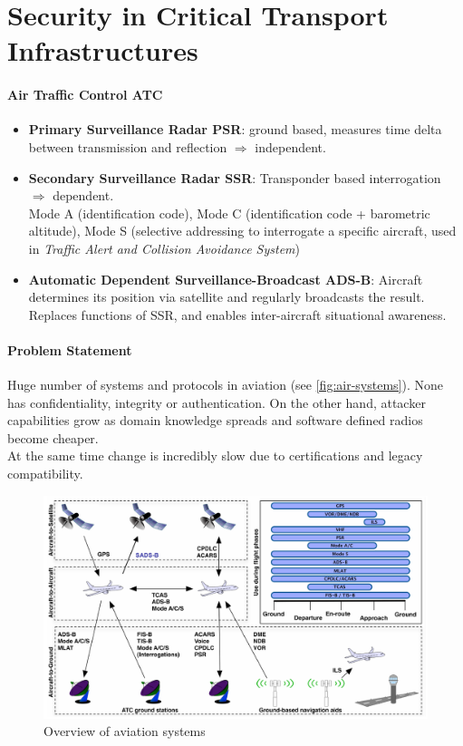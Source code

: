 \section{Security in Critical Transport Infrastructures}


\paragraph{Air Traffic Control ATC}
\begin{itemize}
	\item \textbf{Primary Surveillance Radar PSR}:
	ground based, measures time delta between transmission and reflection $\Rightarrow$ independent.
	\item \textbf{Secondary Surveillance Radar SSR}:
	Transponder based interrogation $\Rightarrow$ dependent. \\
	Mode A (identification code), Mode C (identification code + barometric altitude), Mode S (selective addressing to interrogate a specific aircraft, used in \textit{Traffic Alert and Collision Avoidance System})
	\item \textbf{Automatic Dependent Surveillance-Broadcast ADS-B}:
	Aircraft determines its position via satellite and regularly broadcasts the result.
	Replaces functions of SSR, and enables inter-aircraft situational awareness.
\end{itemize}

\paragraph{Problem Statement}
Huge number of systems and protocols in aviation (see \autoref{fig:air-systems}).
None has confidentiality, integrity or authentication.
On the other hand, attacker capabilities grow as domain knowledge spreads and software defined radios become cheaper.
\\
At the same time change is incredibly slow due to certifications and legacy compatibility.

\begin{figure}[h]
	\centering
	\includegraphics[scale=0.5]{images/6-air-systems.png}
	\caption{Overview of aviation systems}%
	\label{fig:air-systems}
\end{figure}



